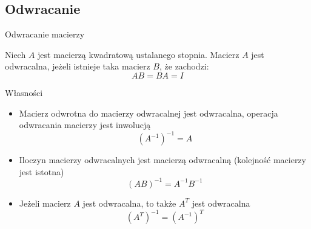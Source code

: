 \documentclass[polish,10pt]{beamer}
\begin{document}
\subsection{Odwracanie}
\begin{frame}{Odwracanie macierzy}
\begin{definition}
    Niech $A$ jest macierzą kwadratową ustalanego stopnia. Macierz $A$ jest odwracalna, jeżeli istnieje taka macierz $B$, że zachodzi:
    \begin{equation*}
        AB = BA = I
    \end{equation*}
\end{definition}

Własności
\begin{itemize}
    \item Macierz odwrotna \cite{Macierz_odwrotna} do macierzy odwracalnej jest odwracalna, operacja odwracania macierzy jest inwolucją
    \begin{equation*}
        (A^{-1})^{-1} = A
    \end{equation*}
    
    \item Iloczyn macierzy odwracalnych jest macierzą odwracalną (kolejność macierzy jest istotna)
    \begin{equation*}
        (AB)^{-1} = A^{-1}B^{-1}
    \end{equation*}
    
    \item Jeżeli macierz $A$ jest odwracalna, to także $A^{T}$ jest odwracalna
    \begin{equation*}
        (A^T)^{-1} = (A^{-1})^T
    \end{equation*}
    
\end{itemize}
\end{frame}
\end{document}
